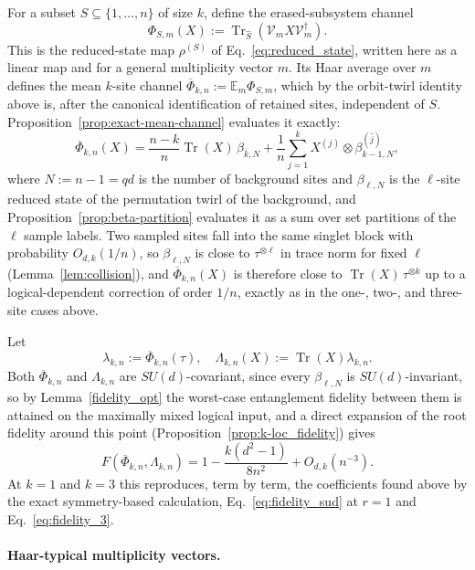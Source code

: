 \documentclass[10pt,twocolumn,superscriptaddress,aps,amsmath,amssymb,citeautoscript,floatfix,prx]{revtex4-2}
\theoremstyle{plain}
\theoremstyle{plain}
\theoremstyle{plain}
\theoremstyle{plain}
\theoremstyle{plain}
\theoremstyle{plain}
\theoremstyle{plain}
\theoremstyle{definition}
\theoremstyle{plain}
\begin{document}
For a subset $S\subseteq\{1,\ldots,n\}$ of size $k$, define the erased-subsystem channel
$$
\Phi_{S,m}(X)
:=
\operatorname{Tr}_{\hat S}(\mathcal{V}_mX\mathcal{V}_m^\dagger).
$$
This is the reduced-state map $\rho^{(S)}$ of Eq.~\eqref{eq:reduced_state}, written here as a linear map and for a general multiplicity 
vector $m$. Its Haar average over $m$ defines the mean $k$-site channel $\overline\Phi_{k,n}:=\mathbb E_m\Phi_{S,m}$, which by the orbit-twirl 
identity above is, after the canonical identification of retained sites, independent of $S$. Proposition~\ref{prop:exact-mean-channel} evaluates it exactly:
$$
\overline\Phi_{k,n}(X)
=
\frac{n-k}n\operatorname{Tr}(X)\,\beta_{k,N}
+
\frac1n\sum_{j=1}^k
X^{(j)}\otimes\beta_{k-1,N}^{(\widehat j)},
$$
where $N:=n-1=qd$ is the number of background sites and $\beta_{\ell,N}$ is the $\ell$-site reduced state of the permutation twirl of the background, 
and Proposition~\ref{prop:beta-partition} evaluates it as a sum over set partitions of the $\ell$ sample labels. 
Two sampled sites fall into the same singlet block with probability $O_{d,k}(1/n)$, so $\beta_{\ell,N}$ is close to $\tau^{\otimes\ell}$ in trace norm for fixed 
$\ell$ (Lemma~\ref{lem:collision}), and $\overline\Phi_{k,n}(X)$ is therefore close to $\operatorname{Tr}(X)\,\tau^{\otimes k}$ up to a logical-dependent correction of order $1/n$, 
exactly as in the one-, two-, and three-site cases above.

Let 
\begin{equation}\label{eq:lambda_k_n}
\lambda_{k,n}:=\overline\Phi_{k,n}(\tau), \quad \Lambda_{k,n}(X):=\operatorname{Tr}(X)\lambda_{k,n}.
\end{equation}
Both $\overline\Phi_{k,n}$ and $\Lambda_{k,n}$ are $SU(d)$-covariant, since every $\beta_{\ell,N}$ is $SU(d)$-invariant, so by Lemma~\ref{fidelity_opt} 
the worst-case entanglement fidelity between them is attained on the maximally mixed logical input, and a direct expansion of the root fidelity around this point 
(Proposition~\ref{prop:k-loc_fidelity}) gives
$$
F(\overline\Phi_{k,n},\Lambda_{k,n})
=
1-\frac{k(d^2-1)}{8n^2}
+O_{d,k}(n^{-3}).
$$
At $k=1$ and $k=3$ this reproduces, term by term, the coefficients found above by the exact symmetry-based calculation, Eq.~\eqref{eq:fidelity_sud} at $r=1$ and Eq.~\eqref{eq:fidelity_3}.

\paragraph{Haar-typical multiplicity vectors.}
\end{document}
